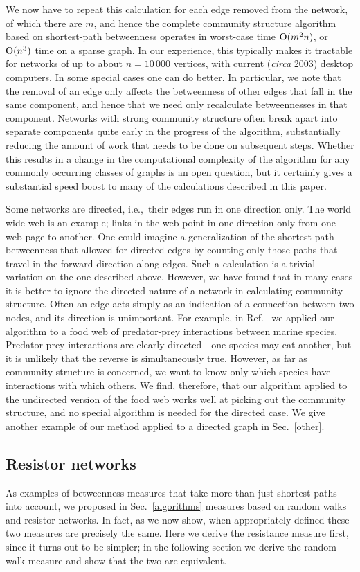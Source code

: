 \documentclass[twocolumn,pre,superscriptaddress]{revtex4}
\begin{document}
We now have to repeat this calculation for each edge removed from the
network, of which there are $m$, and hence the complete community structure
algorithm based on shortest-path betweenness operates in worst-case time
$\mathrm{O}(m^2n)$, or $\mathrm{O}(n^3)$ time on a sparse graph.  In our experience, this
typically makes it tractable for networks of up to about $n=10\,000$
vertices, with current (\textit{circa} 2003) desktop computers.  In some
special cases one can do better.  In particular, we note that the removal
of an edge only affects the betweenness of other edges that fall in the
same component, and hence that we need only recalculate betweennesses in
that component.  Networks with strong community structure often break apart
into separate components quite early in the progress of the algorithm,
substantially reducing the amount of work that needs to be done on
subsequent steps.  Whether this results in a change in the computational
complexity of the algorithm for any commonly occurring classes of graphs is
an open question, but it certainly gives a substantial speed boost to many
of the calculations described in this paper.

Some networks are directed, i.e.,~their edges run in one direction only.
The world wide web is an example; links in the web point in one direction
only from one web page to another.  One could imagine a generalization of
the shortest-path betweenness that allowed for directed edges by counting
only those paths that travel in the forward direction along edges.  Such a
calculation is a trivial variation on the one described above.  However, we
have found that in many cases it is better to ignore the directed nature of
a network in calculating community structure.  Often an edge acts simply as
an indication of a connection between two nodes, and its direction is
unimportant.  For example, in Ref.~ we applied our
algorithm to a food web of predator-prey interactions between marine
species.  Predator-prey interactions are clearly directed---one species may
eat another, but it is unlikely that the reverse is simultaneously true.
However, as far as community structure is concerned, we want to know only
which species have interactions with which others.  We find, therefore,
that our algorithm applied to the undirected version of the food web works
well at picking out the community structure, and no special algorithm is
needed for the directed case.  We give another example of our method
applied to a directed graph in Sec.~\ref{other}.


\subsection{Resistor networks}
\label{resistors}
As examples of betweenness measures that take more than just shortest paths
into account, we proposed in Sec.~\ref{algorithms} measures based on random
walks and resistor networks.  In fact, as we now show, when appropriately
defined these two measures are precisely the same.  Here we derive the
resistance measure first, since it turns out to be simpler; in the
following section we derive the random walk measure and show that the two
are equivalent.
\end{document}
